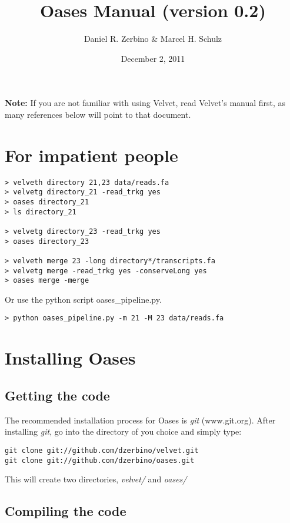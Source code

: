 \documentclass[12pt]{article}
\begin{document}
\title{Oases Manual (version 0.2)}
\author{Daniel R. Zerbino \& Marcel H. Schulz}
\date{December 2, 2011}
\maketitle
\tableofcontents

\newpage

\textbf{Note:} If you are not familiar with using Velvet, read Velvet's manual first, as many references below will point to that document.

\section{For impatient people}
\begin{verbatim}
> velveth directory 21,23 data/reads.fa
> velvetg directory_21 -read_trkg yes
> oases directory_21
> ls directory_21

> velvetg directory_23 -read_trkg yes
> oases directory_23

> velveth merge 23 -long directory*/transcripts.fa
> velvetg merge -read_trkg yes -conserveLong yes
> oases merge -merge
\end{verbatim}

Or use the python script oases\_pipeline.py.

\begin{verbatim}
> python oases_pipeline.py -m 21 -M 23 data/reads.fa
\end{verbatim}

\section{Installing Oases} 

\subsection{Getting the code}

The recommended installation process for Oases is \emph{git} (www.git.org). After installing \emph{git}, go into the directory of you choice and simply type:

\begin{verbatim}
git clone git://github.com/dzerbino/velvet.git
git clone git://github.com/dzerbino/oases.git
\end{verbatim}

This will create two directories, \emph{velvet/} and \emph{oases/}

\subsection{Compiling the code}
\end{document}
